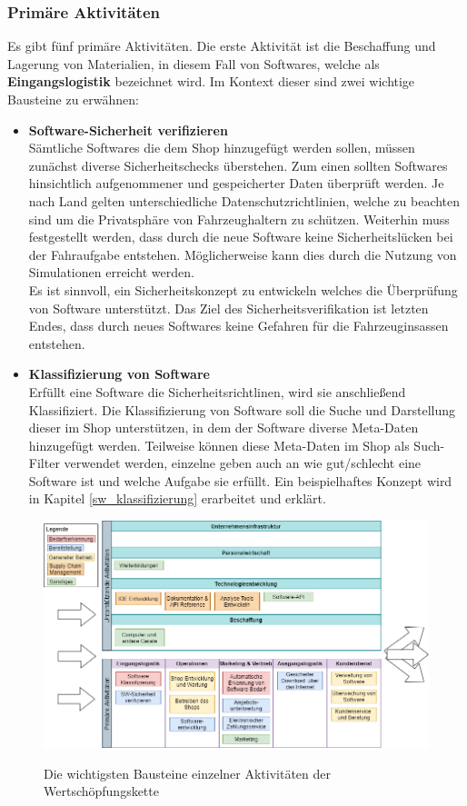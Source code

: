 \subsubsection{Primäre Aktivitäten}
Es gibt fünf primäre Aktivitäten. Die erste Aktivität ist die Beschaffung und Lagerung von Materialien, in diesem Fall von Softwares, welche als \textbf{Eingangslogistik} bezeichnet wird. Im Kontext dieser sind zwei wichtige Bausteine zu erwähnen:
\begin{itemize}
	\item[] \hspace{-0.6cm}\textbf{Software-Sicherheit verifizieren}\\ \label{security}
	Sämtliche Softwares die dem Shop hinzugefügt werden sollen, müssen zunächst diverse Sicherheitschecks überstehen. Zum einen sollten Softwares hinsichtlich aufgenommener und gespeicherter Daten überprüft werden. Je nach Land gelten unterschiedliche Datenschutzrichtlinien, welche zu beachten sind um die Privatsphäre von Fahrzeughaltern zu schützen. Weiterhin muss festgestellt werden, dass durch die neue Software keine Sicherheitslücken bei der Fahraufgabe entstehen. Möglicherweise kann dies durch die Nutzung von Simulationen erreicht werden. \\
	Es ist sinnvoll, ein Sicherheitskonzept zu entwickeln welches die Überprüfung von Software unterstützt. Das Ziel des Sicherheitsverifikation ist letzten Endes, dass durch neues Softwares keine Gefahren für die Fahrzeuginsassen entstehen. 
	
	\item[] \hspace{-0.6cm} \textbf{Klassifizierung von Software}\\
	Erfüllt eine Software die Sicherheitsrichtlinen, wird sie anschließend Klassifiziert. Die Klassifizierung von Software soll die Suche und Darstellung dieser im Shop unterstützen, in dem der Software diverse Meta-Daten hinzugefügt werden. Teilweise können diese Meta-Daten im Shop als Such-Filter verwendet werden, einzelne geben auch an wie gut/schlecht eine Software ist und welche Aufgabe sie erfüllt. Ein beispielhaftes Konzept  wird in Kapitel \ref{sw_klassifizierung} erarbeitet und erklärt.
\end{itemize}
\begin{figure}[!h]
	\hspace{-2.5cm}
	\includegraphics[width=1.2\columnwidth]{pictures/konzept-wsk.png}
	\label{img:wsk}
	\caption{Die wichtigsten Bausteine einzelner Aktivitäten der Wertschöpfungskette}
\end{figure}
